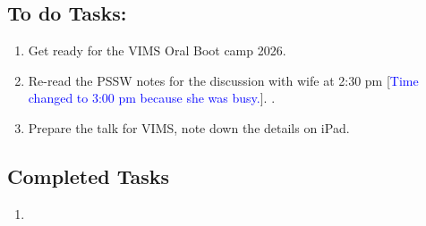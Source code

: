 \subsection*{To do Tasks:}
\begin{enumerate}
    \item Get ready for the VIMS Oral Boot camp 2026.
    \item Re-read the PSSW notes for the discussion with wife at 2:30 pm [\textcolor{blue}{Time changed to 3:00 pm because she was busy.}]. \cmark. 
    \item Prepare the talk for VIMS, note down the details on iPad. 
\end{enumerate}
\subsection*{Completed Tasks}
\begin{enumerate}[\ding{52}]  %
    \item 
\end{enumerate}
\starredline